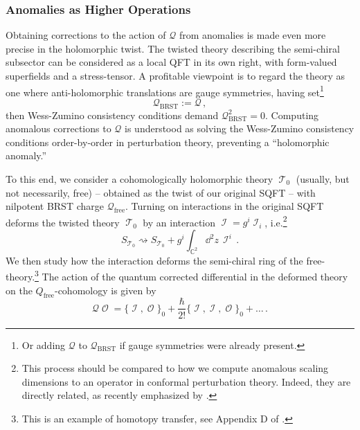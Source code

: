 \documentclass[11pt]{article}
\DeclareMathOperator{\calI}{\mathcal{I}}
\DeclareMathOperator{\calO}{\mathcal{O}}
\DeclareMathOperator{\calT}{\mathcal{T}}
\def\bbC{\mathbb{C}}
\DeclareMathOperator{\free}{{\mathrm{free}}}
\renewcommand{\bm}{\mathcal}
\begin{document}
\subsubsection{Anomalies as Higher Operations}
Obtaining corrections to the action of $\bm{Q}$ from anomalies is made even more precise in the holomorphic twist. The twisted theory describing the semi-chiral subsector can be considered as a local QFT in its own right, with form-valued superfields and a stress-tensor. A profitable viewpoint is to regard the theory as one where anti-holomorphic translations are gauge symmetries, having set\footnote{Or adding $\bm{Q}$ to $\bm{Q}_{\mathrm{BRST}}$ if gauge symmetries were already present.}
\begin{equation}
    \bm{Q}_{\mathrm{BRST}} := \bm{Q}\,,
\end{equation}
then Wess-Zumino consistency conditions demand $\bm{Q}_{\mathrm{BRST}}^2 = 0$. Computing anomalous corrections to $\bm{Q}$ is understood as solving the Wess-Zumino consistency conditions order-by-order in perturbation theory, preventing a ``holomorphic anomaly.''

To this end, we consider a cohomologically holomorphic theory $\calT_0$ (usually, but not necessarily, free) -- obtained as the twist of our original SQFT -- with nilpotent BRST charge $\bm{Q}_{\free}$. Turning on interactions in the original SQFT deforms the twisted theory $\calT_0$ by an interaction $\calI = g^i \calI_i$, i.e.\footnote{This process should be compared to how we compute anomalous scaling dimensions to an operator in conformal perturbation theory. Indeed, they are directly related, as recently emphasized by \cite{Scheinpflug:2025sqn}.}
\begin{equation}
    S_{\calT_0} \rightsquigarrow S_{\calT_0} + g^i \int_{\bbC^2} \dd^2z \, \calI^i\,.
\end{equation}
We then study how the interaction deforms the semi-chiral ring of the free-theory.\footnote{This is an example of homotopy transfer, see Appendix D of \cite{Budzik:2023xbr}.} The action of the quantum corrected differential in the deformed theory on the $Q_{\text{free}}$-cohomology is given by
\begin{equation}\label{eq:QonO}
    \bm{Q}\! \calO = \{\calI, \calO\}_0 + \frac{\hbar}{2!}\{\calI,\calI,\calO\}_0 + \dots\,.
\end{equation}
\end{document}
